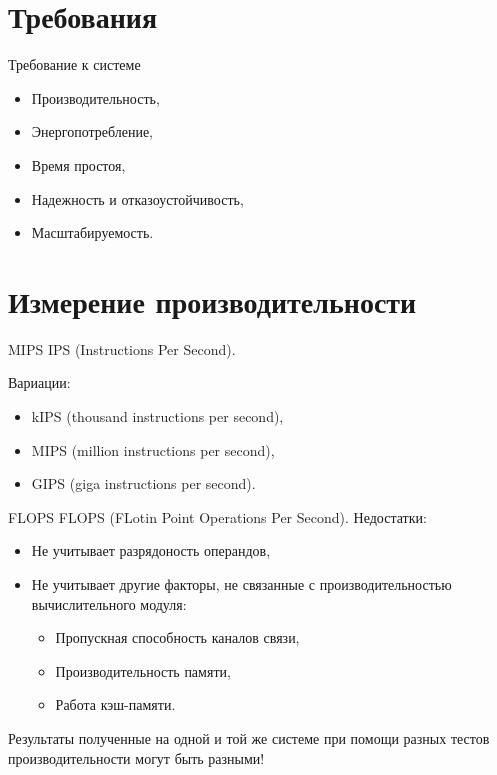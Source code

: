 \section{Требования}

\begin{frame}{Требование к системе}
\begin{itemize}
    \item Производительность,
    \item Энергопотребление,
    \item Время простоя,
    \item Надежность и отказоустойчивость,
    \item Масштабируемость.
\end{itemize}
\end{frame}

\section{Измерение производительности}

\begin{frame}{MIPS}
IPS (\abbr Instructions Per Second).
\vspace*{0.5cm}

Вариации:
\begin{itemize}
    \item kIPS (\abbr thousand instructions per second),
    \item MIPS (\abbr million instructions per second),
    \item GIPS (\abbr giga instructions per second).
\end{itemize}
\end{frame}

\begin{frame}{FLOPS}
FLOPS (\abbr FLotin Point Operations Per Second).
\vfill
Недостатки:
\begin{itemize}
    \item Не учитывает разрядоность операндов,
    \item Не учитывает другие факторы, не связанные с производительностью
    вычислительного модуля:
    \begin{itemize}
        \item Пропускная способность каналов связи,
        \item Производительность памяти,
        \item Работа кэш-памяти.
    \end{itemize}
\end{itemize}
\vfill
Результаты полученные на одной и той же системе при помощи разных тестов
производительности могут быть разными!
\end{frame}

